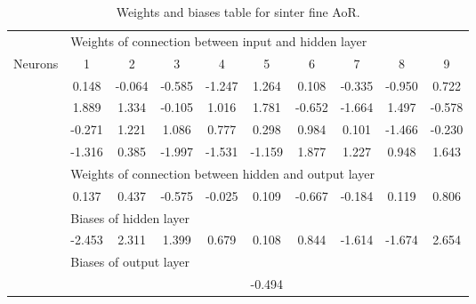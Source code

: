 \begin{table}[htbp] 
 \centering 
\begin{tabular}{l|ccccccccc} 
 \hline 
   &    \multicolumn{9}{l}{Weights of connection between input and hidden layer}  \\ 
 Neurons & 1 &  2 &  3 &  4 &  5 &  6 &  7 &  8 & 9 \\ 
 \hline 
  & 0.148 &  -0.064 &  -0.585 &  -1.247 &  1.264 &  0.108 &  -0.335 &  -0.950 &  0.722 \\ 
  & 1.889 &  1.334 &  -0.105 &  1.016 &  1.781 &  -0.652 &  -1.664 &  1.497 &  -0.578 \\ 
  & -0.271 &  1.221 &  1.086 &  0.777 &  0.298 &  0.984 &  0.101 &  -1.466 &  -0.230 \\ 
  & -1.316 &  0.385 &  -1.997 &  -1.531 &  -1.159 &  1.877 &  1.227 &  0.948 &  1.643 \\ 
\hline 
   &    \multicolumn{9}{l}{Weights of connection between hidden and output layer}  \\ 
  & 0.137 &  0.437 &  -0.575 &  -0.025 &  0.109 &  -0.667 &  -0.184 &  0.119 &  0.806 \\ 
\hline 
   &    \multicolumn{9}{l}{Biases of hidden layer}  \\ 
  & -2.453 &  2.311 &  1.399 &  0.679 &  0.108 &  0.844 &  -1.614 &  -1.674 &  2.654 \\ 
\hline 
   &    \multicolumn{9}{l}{Biases of output layer}  \\ 
 &    \multicolumn{9}{c}{-0.494}  \\ 
\hline 
 \end{tabular} 
\caption[Weights and biases table for sinter fine AoR]{Weights and biases table
for sinter fine \acs{AoR}.}
\label{tab:35sinterfineaor} 
\end{table}